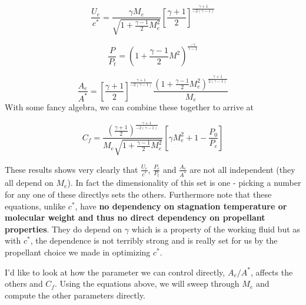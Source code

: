 \documentclass[twocolumn]{memoir} %
\begin{document}
\begin{equation}
    \frac{U_e}{c^*} = \frac{\gamma M_e}{\sqrt{1 + \frac{\gamma - 1}{2}M_e^2}}\left[\frac{\gamma + 1}{2}\right]^{\frac{\gamma + 1}{-2(\gamma-1)}}
\end{equation}

\begin{equation}
    \frac{P}{P_t} = \left(1 + \frac{\gamma - 1}{2}M^2\right)^{\frac{-\gamma}{\gamma-1}}
\end{equation}

\begin{equation}
    \frac{A_e}{A^*} = \left[\frac{\gamma + 1}{2}\right]^{\frac{\gamma + 1}{-2(\gamma - 1)}} \frac{\left(1 + \frac{\gamma-1}{2}M_e^2 \right)^{\frac{\gamma + 1}{2(\gamma - 1)}}}{M_e}
\end{equation}
%
With some fancy algebra, we can combine these together to arrive at

\begin{equation}
    C_f = \frac{\left(\frac{\gamma + 1}{2}\right)^{\frac{\gamma + 1}{-2(\gamma-1)}}}{M_e \sqrt{1+\frac{\gamma - 1}{2}M_e^2}}\left[\gamma M_e^2 + 1 - \frac{P_0}{P_e}\right]
    \label{eq:Cf}
\end{equation}

These results shows very clearly that
\(\frac{U_e}{c^*}\), \(\frac{P_e}{P_t}\) and \(\frac{A_e}{A^*}\) are not
all independent (they all depend on \(M_e\)). In fact the dimensionality
of this set is one - picking a number for any one of these directlys
sets the others. Furthermore note that these equations, unlike \(c^*\),
have \textbf{no dependency on stagnation temperature or molecular weight and
thus no direct dependency on propellant properties}. They do depend on
\(\gamma\) which is a property of the working fluid but as with \(c^*\),
the dependence is not terribly strong and is really set for us by the
propellant choice we made in optimizing \(c^*\).

I'd like to look at how the parameter we can control directly,
\(A_e/A^*\), affects the others and \(C_f\). Using the equations
above, we will sweep through \(M_e\) and compute the other parameters
directly.
\end{document}
